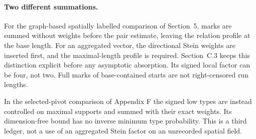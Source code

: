 \paragraph{Two different summations.}
For the graph-based spatially labelled comparison of Section~5, marks
are summed without weights before the pair estimate, leaving the
relation profile at the base length.
For an aggregated vector, the directional Stein weights are inserted
first, and the maximal-length profile is required. Section~C.3 keeps
this distinction explicit before any asymptotic absorption. Its signed
local factor can be four, not two. Full marks of base-contained starts
are not right-censored run lengths.

In the selected-pivot comparison of Appendix F the signed low types are
instead controlled on maximal supports and summed with their exact
weights. Its dimension-free bound has no inverse minimum type
probability. This is a third ledger, not a use of an aggregated
Stein factor on an unrecorded spatial field.
